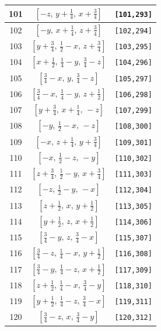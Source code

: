 \documentclass[fleqn,8pt]{jsarticle}
\begin{document}
\begin{longtable}{ccc}
101 & $\left[ - z,\, y + \frac{1}{4},\, x + \frac{3}{4} \right]$ & {\tt [101,293]} \\ \hline
102 & $\left[ - y,\, x + \frac{1}{4},\, z + \frac{3}{4} \right]$ & {\tt [102,294]} \\ \hline
103 & $\left[ y + \frac{3}{4},\, \frac{1}{2} - x,\, z + \frac{3}{4} \right]$ & {\tt [103,295]} \\ \hline
104 & $\left[ x + \frac{1}{2},\, \frac{1}{4} - y,\, \frac{3}{4} - z \right]$ & {\tt [104,296]} \\ \hline
105 & $\left[ \frac{3}{4} - x,\, y,\, \frac{3}{4} - z \right]$ & {\tt [105,297]} \\ \hline
106 & $\left[ \frac{3}{4} - x,\, \frac{1}{4} - y,\, z + \frac{1}{2} \right]$ & {\tt [106,298]} \\ \hline
107 & $\left[ y + \frac{3}{4},\, x + \frac{1}{4},\, - z \right]$ & {\tt [107,299]} \\ \hline
108 & $\left[ - y,\, \frac{1}{2} - x,\, - z \right]$ & {\tt [108,300]} \\ \hline
109 & $\left[ - x,\, z + \frac{1}{4},\, y + \frac{3}{4} \right]$ & {\tt [109,301]} \\ \hline
110 & $\left[ - x,\, \frac{1}{2} - z,\, - y \right]$ & {\tt [110,302]} \\ \hline
111 & $\left[ z + \frac{3}{4},\, \frac{1}{2} - y,\, x + \frac{3}{4} \right]$ & {\tt [111,303]} \\ \hline
112 & $\left[ - z,\, \frac{1}{2} - y,\, - x \right]$ & {\tt [112,304]} \\ \hline
113 & $\left[ z + \frac{1}{2},\, x,\, y + \frac{1}{2} \right]$ & {\tt [113,305]} \\ \hline
114 & $\left[ y + \frac{1}{2},\, z,\, x + \frac{1}{2} \right]$ & {\tt [114,306]} \\ \hline
115 & $\left[ \frac{3}{4} - y,\, z,\, \frac{3}{4} - x \right]$ & {\tt [115,307]} \\ \hline
116 & $\left[ \frac{3}{4} - z,\, \frac{1}{4} - x,\, y + \frac{1}{2} \right]$ & {\tt [116,308]} \\ \hline
117 & $\left[ \frac{3}{4} - y,\, \frac{1}{4} - z,\, x + \frac{1}{2} \right]$ & {\tt [117,309]} \\ \hline
118 & $\left[ z + \frac{1}{2},\, \frac{1}{4} - x,\, \frac{3}{4} - y \right]$ & {\tt [118,310]} \\ \hline
119 & $\left[ y + \frac{1}{2},\, \frac{1}{4} - z,\, \frac{3}{4} - x \right]$ & {\tt [119,311]} \\ \hline
120 & $\left[ \frac{3}{4} - z,\, x,\, \frac{3}{4} - y \right]$ & {\tt [120,312]} \\ \hline

\end{longtable}
\end{document}
